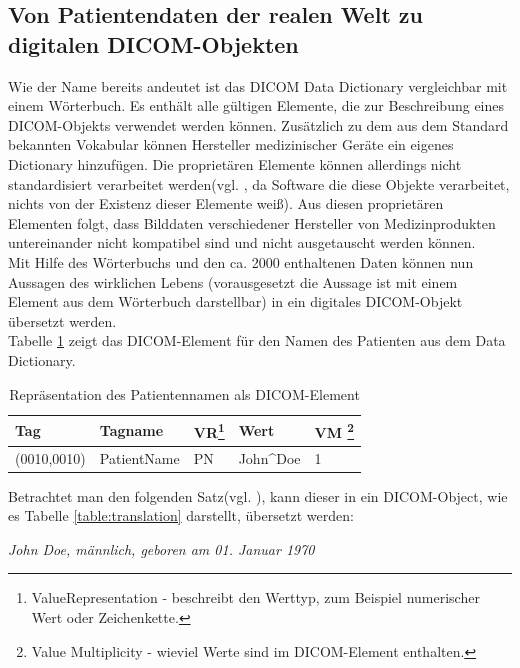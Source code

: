\FloatBarrier
\subsection{Von Patientendaten der realen Welt zu digitalen DICOM-Objekten} \label{grundlagen:dicomObjects}
Wie der Name bereits andeutet ist das DICOM Data Dictionary vergleichbar mit einem Wörterbuch. Es enthält alle gültigen Elemente, die zur Beschreibung eines DICOM-Objekts verwendet werden können. Zusätzlich zu dem aus dem Standard bekannten Vokabular können Hersteller medizinischer Geräte ein eigenes Dictionary hinzufügen. Die proprietären Elemente können allerdings nicht standardisiert verarbeitet werden(vgl. \cite[S.45]{pianykh:dicom}, da Software die diese Objekte verarbeitet, nichts von der Existenz dieser Elemente weiß). Aus diesen proprietären Elementen folgt, dass Bilddaten verschiedener Hersteller von Medizinprodukten untereinander nicht kompatibel sind und nicht ausgetauscht werden können.\\
Mit Hilfe des Wörterbuchs und den ca. 2000 enthaltenen Daten können nun Aussagen des wirklichen Lebens (vorausgesetzt die Aussage ist mit einem Element aus dem Wörterbuch darstellbar) in ein digitales DICOM-Objekt übersetzt werden.\\
Tabelle \ref{table:patientname} zeigt das DICOM-Element für den Namen des Patienten aus dem Data Dictionary\cite[S. 14]{dicom:dd}.

\begin{table}
    \begin{tabularx}{\textwidth}{|X|X|X|X|X|}
    \toprule
    \hline
    \textbf{Tag}         & \textbf{Tagname}     & \textbf{VR\footnote{ValueRepresentation - beschreibt den Werttyp, zum Beispiel numerischer Wert oder Zeichenkette.}} & \textbf{Wert}     	& \textbf{VM \footnote{Value Multiplicity - wieviel Werte sind im DICOM-Element enthalten.}} \\ \hline
    (0010,0010) 		 & PatientName 			& PN 		  & John\^{}Doe 		& 1  \\  \hline
    \bottomrule
    \end{tabularx}
    \caption {Repräsentation des Patientennamen als DICOM-Element}
    \label{table:patientname}
\end{table}

Betrachtet man den folgenden Satz(vgl. \cite[S.46]{pianykh:dicom}), kann dieser in ein DICOM-Object, wie es Tabelle \ref*{table:translation} darstellt, übersetzt werden:
\begin{center}
\textit{\glqq John Doe, männlich, geboren am 01. Januar 1970\grqq}
\end{center}

